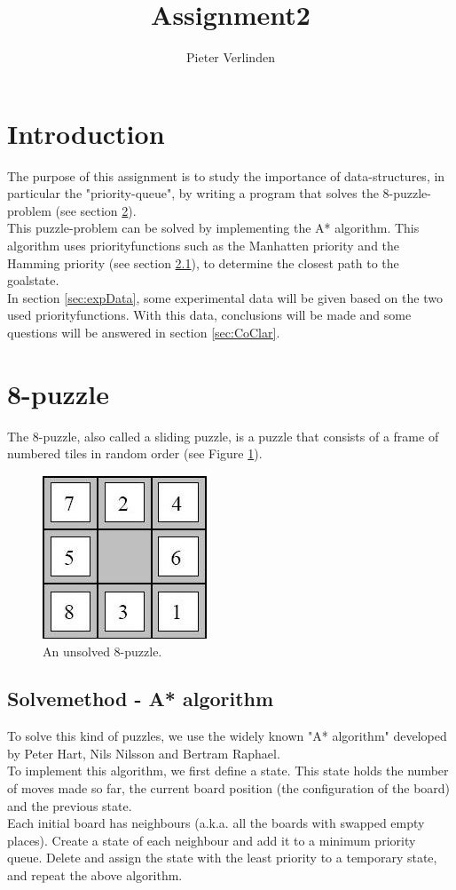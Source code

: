 \documentclass[12pt,a4paper,oneside]{article}
\author{Pieter Verlinden}
\title{Assignment2}
\begin{document}

\tableofcontents
\newpage
\section{Introduction}
The purpose of this assignment is to study the importance of data-structures, in particular the "priority-queue", by writing a program that solves the 8-puzzle-problem (see section \ref{sec:8puz}). 
\\

This puzzle-problem can be solved by implementing the A* algorithm\cite{A*Wiki}. This algorithm uses priorityfunctions such as the Manhatten priority and the Hamming priority (see section \ref{sec:solveA*}), to determine the closest path to the goalstate.
\\

In section \ref{sec:expData}, some experimental data will be given based on the two used priorityfunctions. With this data, conclusions will be made and some questions will be answered in section \ref{sec:CoClar}.
\newpage

\section{8-puzzle}\label{sec:8puz}
The 8-puzzle, also called a sliding puzzle, is a puzzle that consists of a frame of numbered tiles in random order (see Figure \ref{fig:8-puz}).
\begin{figure}[H]
	\centering
	\includegraphics[scale=0.85]{8-puz.jpg} 
	\caption{An unsolved 8-puzzle.}
	\label{fig:8-puz}
\end{figure}

\subsection{Solvemethod - A* algorithm}\label{sec:solveA*}
To solve this kind of puzzles, we use the widely known "A* algorithm"\cite{A*Wiki} developed by Peter Hart, Nils Nilsson and Bertram Raphael.\\
To implement this algorithm, we first define a state. This state holds the number of moves made so far, the current board position (the configuration of the board) and the previous state.\\
Each initial board has neighbours (a.k.a. all the boards with swapped empty places). Create a state of each neighbour and add it to a minimum priority queue. Delete and assign the state with the least priority to a temporary state, and repeat the above algorithm.\\
\end{document}
